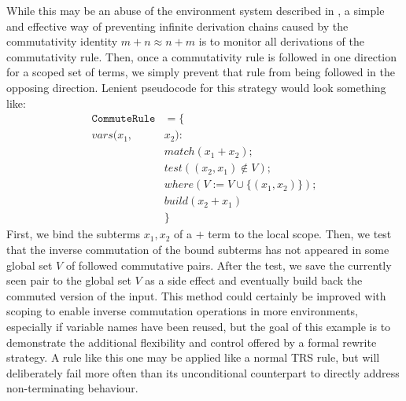 \documentclass{article}
\begin{document}
While this may be an abuse of the environment system described in \cite{elco1998building},
a simple and effective way of preventing infinite derivation chains caused by the commutativity identity $m + n \approx n + m$ is to
monitor all derivations of the commutativity rule. Then, once a commutativity rule is followed in one direction for a scoped set of terms,
we simply prevent that rule from being followed in the opposing direction. Lenient pseudocode for this strategy would look something like:
\begin{align*}
    \texttt{CommuteRule} &= \{\\
        vars(x_1, &x_2) : \\
        &match(x_1 + x_2); \\
        &test((x_2, x_1) \notin V); \\
        &where(V := V \cup \{(x_1, x_2)\}); \\
        &build(x_2 + x_1)\\
        &\}
\end{align*}
First, we bind the subterms $x_1,x_2$ of a $+$ term to the local scope.
Then, we test that the inverse commutation of the bound subterms has not appeared in some global set $V$ of
followed commutative pairs.
After the test, we save the currently seen pair to the global set $V$ as a side effect and eventually build back the commuted version of the input.
This method could certainly be improved with scoping to enable inverse commutation operations in more environments, especially if variable names have
been reused, but the goal of this example is to demonstrate the additional flexibility and control offered by a formal rewrite strategy.
A rule like this one may be applied like a normal TRS rule, but will deliberately fail more often than
its unconditional counterpart to directly address non-terminating behaviour.
\end{document}
